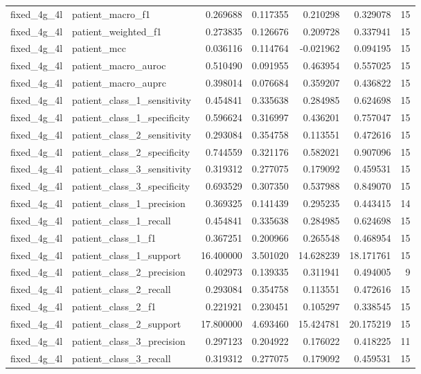 \begin{tabular}{llrrrrr}
fixed_4g_4l & patient_macro_f1 & 0.269688 & 0.117355 & 0.210298 & 0.329078 & 15 \\
fixed_4g_4l & patient_weighted_f1 & 0.273835 & 0.126676 & 0.209728 & 0.337941 & 15 \\
fixed_4g_4l & patient_mcc & 0.036116 & 0.114764 & -0.021962 & 0.094195 & 15 \\
fixed_4g_4l & patient_macro_auroc & 0.510490 & 0.091955 & 0.463954 & 0.557025 & 15 \\
fixed_4g_4l & patient_macro_auprc & 0.398014 & 0.076684 & 0.359207 & 0.436822 & 15 \\
fixed_4g_4l & patient_class_1_sensitivity & 0.454841 & 0.335638 & 0.284985 & 0.624698 & 15 \\
fixed_4g_4l & patient_class_1_specificity & 0.596624 & 0.316997 & 0.436201 & 0.757047 & 15 \\
fixed_4g_4l & patient_class_2_sensitivity & 0.293084 & 0.354758 & 0.113551 & 0.472616 & 15 \\
fixed_4g_4l & patient_class_2_specificity & 0.744559 & 0.321176 & 0.582021 & 0.907096 & 15 \\
fixed_4g_4l & patient_class_3_sensitivity & 0.319312 & 0.277075 & 0.179092 & 0.459531 & 15 \\
fixed_4g_4l & patient_class_3_specificity & 0.693529 & 0.307350 & 0.537988 & 0.849070 & 15 \\
fixed_4g_4l & patient_class_1_precision & 0.369325 & 0.141439 & 0.295235 & 0.443415 & 14 \\
fixed_4g_4l & patient_class_1_recall & 0.454841 & 0.335638 & 0.284985 & 0.624698 & 15 \\
fixed_4g_4l & patient_class_1_f1 & 0.367251 & 0.200966 & 0.265548 & 0.468954 & 15 \\
fixed_4g_4l & patient_class_1_support & 16.400000 & 3.501020 & 14.628239 & 18.171761 & 15 \\
fixed_4g_4l & patient_class_2_precision & 0.402973 & 0.139335 & 0.311941 & 0.494005 & 9 \\
fixed_4g_4l & patient_class_2_recall & 0.293084 & 0.354758 & 0.113551 & 0.472616 & 15 \\
fixed_4g_4l & patient_class_2_f1 & 0.221921 & 0.230451 & 0.105297 & 0.338545 & 15 \\
fixed_4g_4l & patient_class_2_support & 17.800000 & 4.693460 & 15.424781 & 20.175219 & 15 \\
fixed_4g_4l & patient_class_3_precision & 0.297123 & 0.204922 & 0.176022 & 0.418225 & 11 \\
fixed_4g_4l & patient_class_3_recall & 0.319312 & 0.277075 & 0.179092 & 0.459531 & 15 \\

\end{tabular}

